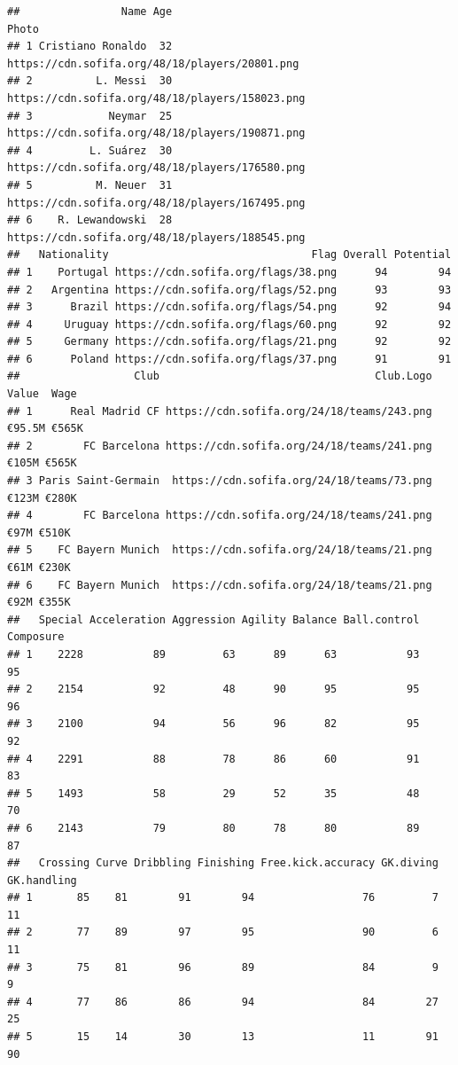 \documentclass[
]{article}
\theoremstyle{definition}
\theoremstyle{definition}
\theoremstyle{definition}
\theoremstyle{definition}
\theoremstyle{remark}
\begin{document}
\begin{verbatim}
##                Name Age                                           Photo
## 1 Cristiano Ronaldo  32  https://cdn.sofifa.org/48/18/players/20801.png
## 2          L. Messi  30 https://cdn.sofifa.org/48/18/players/158023.png
## 3            Neymar  25 https://cdn.sofifa.org/48/18/players/190871.png
## 4         L. Suárez  30 https://cdn.sofifa.org/48/18/players/176580.png
## 5          M. Neuer  31 https://cdn.sofifa.org/48/18/players/167495.png
## 6    R. Lewandowski  28 https://cdn.sofifa.org/48/18/players/188545.png
##   Nationality                                Flag Overall Potential
## 1    Portugal https://cdn.sofifa.org/flags/38.png      94        94
## 2   Argentina https://cdn.sofifa.org/flags/52.png      93        93
## 3      Brazil https://cdn.sofifa.org/flags/54.png      92        94
## 4     Uruguay https://cdn.sofifa.org/flags/60.png      92        92
## 5     Germany https://cdn.sofifa.org/flags/21.png      92        92
## 6      Poland https://cdn.sofifa.org/flags/37.png      91        91
##                  Club                                  Club.Logo  Value  Wage
## 1      Real Madrid CF https://cdn.sofifa.org/24/18/teams/243.png €95.5M €565K
## 2        FC Barcelona https://cdn.sofifa.org/24/18/teams/241.png  €105M €565K
## 3 Paris Saint-Germain  https://cdn.sofifa.org/24/18/teams/73.png  €123M €280K
## 4        FC Barcelona https://cdn.sofifa.org/24/18/teams/241.png   €97M €510K
## 5    FC Bayern Munich  https://cdn.sofifa.org/24/18/teams/21.png   €61M €230K
## 6    FC Bayern Munich  https://cdn.sofifa.org/24/18/teams/21.png   €92M €355K
##   Special Acceleration Aggression Agility Balance Ball.control Composure
## 1    2228           89         63      89      63           93        95
## 2    2154           92         48      90      95           95        96
## 3    2100           94         56      96      82           95        92
## 4    2291           88         78      86      60           91        83
## 5    1493           58         29      52      35           48        70
## 6    2143           79         80      78      80           89        87
##   Crossing Curve Dribbling Finishing Free.kick.accuracy GK.diving GK.handling
## 1       85    81        91        94                 76         7          11
## 2       77    89        97        95                 90         6          11
## 3       75    81        96        89                 84         9           9
## 4       77    86        86        94                 84        27          25
## 5       15    14        30        13                 11        91          90

\end{verbatim}
\end{document}
